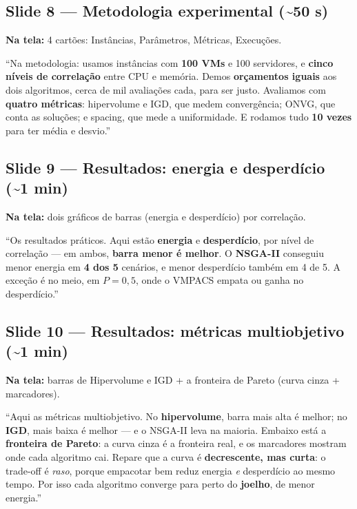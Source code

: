 \documentclass[11pt]{article}
\newcommand{\tela}[1]{\noindent\textcolor{tela}{\textbf{Na tela:} #1}\par\vspace{2pt}}
\newcommand{\tempo}[1]{\hfill\textcolor{cinza}{\small(\textasciitilde #1)}}
\begin{document}
\subsection{Slide 8 --- Metodologia experimental \tempo{50 s}}
\tela{4 cartões: Instâncias, Parâmetros, Métricas, Execuções.}
\begin{fala}
``Na metodologia: usamos instâncias com \textbf{100 VMs} e 100 servidores, e
\textbf{cinco níveis de correlação} entre CPU e memória. Demos \textbf{orçamentos
iguais} aos dois algoritmos, cerca de mil avaliações cada, para ser justo.
Avaliamos com \textbf{quatro métricas}: hipervolume e IGD, que medem
convergência; ONVG, que conta as soluções; e spacing, que mede a uniformidade. E
rodamos tudo \textbf{10 vezes} para ter média e desvio.''
\end{fala}

\subsection{Slide 9 --- Resultados: energia e desperdício \tempo{1 min}}
\tela{dois gráficos de barras (energia e desperdício) por correlação.}
\begin{fala}
``Os resultados práticos. Aqui estão \textbf{energia} e \textbf{desperdício}, por
nível de correlação --- em ambos, \textbf{barra menor é melhor}. O \textbf{NSGA-II}
conseguiu menor energia em \textbf{4 dos 5} cenários, e menor desperdício também
em 4 de 5. A exceção é no meio, em $P = 0{,}5$, onde o VMPACS empata ou ganha no
desperdício.''
\end{fala}

\subsection{Slide 10 --- Resultados: métricas multiobjetivo \tempo{1 min}}
\tela{barras de Hipervolume e IGD + a fronteira de Pareto (curva cinza + marcadores).}
\begin{fala}
``Aqui as métricas multiobjetivo. No \textbf{hipervolume}, barra mais alta é
melhor; no \textbf{IGD}, mais baixa é melhor --- e o NSGA-II leva na maioria.
Embaixo está a \textbf{fronteira de Pareto}: a curva cinza é a fronteira real, e
os marcadores mostram onde cada algoritmo cai. Repare que a curva é
\textbf{decrescente, mas curta}: o trade-off é \emph{raso}, porque empacotar bem
reduz energia \emph{e} desperdício ao mesmo tempo. Por isso cada algoritmo
converge para perto do \textbf{joelho}, de menor energia.''
\end{fala}
\end{document}
